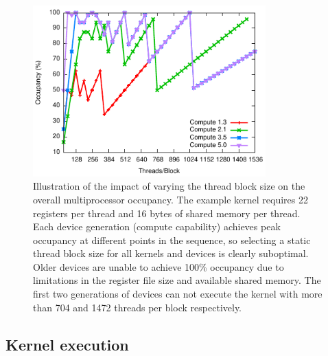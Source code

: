 \begin{figure}[htb]
    \centering
    \includegraphics[width=0.8\textwidth]{images/impl/occupancy/occupancy}
    \caption[Impact of varying thread block size on multiprocessor occupancy]{
        Illustration of the impact of varying the thread block size on the
        overall multiprocessor occupancy. The example kernel requires 22
        registers per thread and 16 bytes of shared memory per thread. Each
        device generation (compute capability) achieves peak occupancy at
        different points in the sequence, so selecting a static thread block
        size for all kernels and devices is clearly suboptimal. Older devices
        are unable to achieve 100\% occupancy due to limitations in the register
        file size and available shared memory. The first two generations of
        devices can not execute the kernel with more than 704 and 1472 threads
        per block respectively.}
    \label{fig:occupancy}
\end{figure}


\subsection{Kernel execution}

